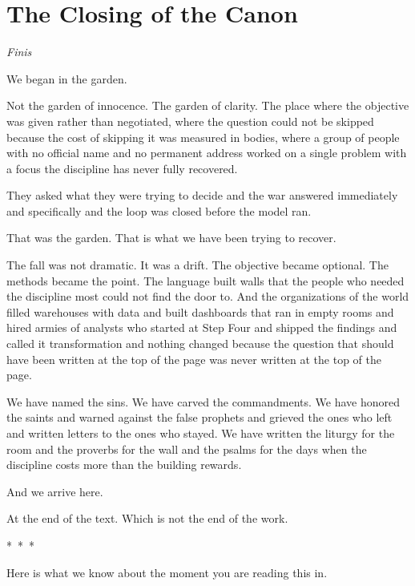 \chapter{The Closing of the Canon}
\begin{center}
  \small\itshape Finis
\end{center}
\vspace{2em}

We began in the garden.

Not the garden of innocence. The garden of clarity. The place where the objective was given rather than negotiated, where the question could not be skipped because the cost of skipping it was measured in bodies, where a group of people with no official name and no permanent address worked on a single problem with a focus the discipline has never fully recovered.

They asked what they were trying to decide and the war answered immediately and specifically and the loop was closed before the model ran.

That was the garden. That is what we have been trying to recover.

The fall was not dramatic. It was a drift. The objective became optional. The methods became the point. The language built walls that the people who needed the discipline most could not find the door to. And the organizations of the world filled warehouses with data and built dashboards that ran in empty rooms and hired armies of analysts who started at Step Four and shipped the findings and called it transformation and nothing changed because the question that should have been written at the top of the page was never written at the top of the page.

We have named the sins. We have carved the commandments. We have honored the saints and warned against the false prophets and grieved the ones who left and written letters to the ones who stayed. We have written the liturgy for the room and the proverbs for the wall and the psalms for the days when the discipline costs more than the building rewards.

And we arrive here.

At the end of the text. Which is not the end of the work.

\vspace{1.5em}
\begin{center}
  *~*~*
\end{center}
\vspace{1.5em}

Here is what we know about the moment you are reading this in.

